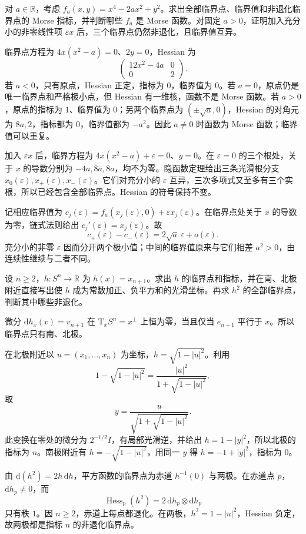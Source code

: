 \BookExercises
\begin{exercise}\label{g2:ex:quartic-morse-bifurcation}
	对 \(a\in\mathbb R\)，考虑 \(f_a(x,y)=x^4-2ax^2+y^2\)。求出全部临界点、临界值和非退化临界点的 Morse 指标，并判断哪些 \(f_a\) 是 Morse 函数。对固定 \(a>0\)，证明加入充分小的非零线性项 \(\varepsilon x\) 后，三个临界点仍然非退化，且临界值互异。
\end{exercise}
\begin{solution}
	临界点方程为 \(4x(x^2-a)=0\)、\(2y=0\)，Hessian 为
	\[
		\begin{pmatrix}12x^2-4a&0\\0&2\end{pmatrix}.
	\]
	若 \(a<0\)，只有原点，Hessian 正定，指标为 \(0\)，临界值为 \(0\)。若 \(a=0\)，原点仍是唯一临界点和严格极小点，但 Hessian 有一维核，函数不是 Morse 函数。若 \(a>0\)，原点的指标为 \(1\)、临界值为 \(0\)；另两个临界点为 \((\pm\sqrt a,0)\)，Hessian 的对角元为 \(8a,2\)，指标都为 \(0\)，临界值都为 \(-a^2\)。因此 \(a\ne0\) 时函数为 Morse 函数；临界值可以重复。

	加入 \(\varepsilon x\) 后，临界方程为 \(4x(x^2-a)+\varepsilon=0\)、\(y=0\)。在 \(\varepsilon=0\) 的三个根处，关于 \(x\) 的导数分别为 \(-4a,8a,8a\)，均不为零。隐函数定理给出三条光滑根分支 \(x_0(\varepsilon),x_+(\varepsilon),x_-(\varepsilon)\)。它们对充分小的 \(\varepsilon\) 互异，三次多项式又至多有三个实根，所以已经包含全部临界点。Hessian 的符号保持不变。

	记相应临界值为 \(c_j(\varepsilon)=f_a(x_j(\varepsilon),0)+\varepsilon x_j(\varepsilon)\)。在临界点处关于 \(x\) 的导数为零，链式法则给出 \(c_j'(\varepsilon)=x_j(\varepsilon)\)。故
	\[
		c_+(\varepsilon)-c_-(\varepsilon)=2\sqrt a\,\varepsilon+o(\varepsilon).
	\]
	充分小的非零 \(\varepsilon\) 因而分开两个极小值；中间的临界值原来与它们相差 \(a^2>0\)，由连续性继续与二者不同。
\end{solution}

\begin{exercise}\label{g2:ex:sphere-height-morse-coordinates}
	设 \(n\ge2\)，\(h:S^n\to\mathbb R\) 为 \(h(x)=x_{n+1}\)。求出 \(h\) 的临界点和指标，并在南、北极附近直接写出使 \(h\) 成为常数加正、负平方和的光滑坐标。再求 \(h^2\) 的全部临界点，判断其中哪些非退化。
\end{exercise}
\begin{solution}
	微分 \(\mathrm dh_x(v)=v_{n+1}\) 在 \(\mathrm T_xS^n=x^\perp\) 上恒为零，当且仅当 \(e_{n+1}\) 平行于 \(x\)。所以临界点只有南、北极。

	在北极附近以 \(u=(x_1,\ldots,x_n)\) 为坐标，\(h=\sqrt{1-|u|^2}\)。利用
	\[
		1-\sqrt{1-|u|^2}=\frac{|u|^2}{1+\sqrt{1-|u|^2}},
	\]
	取
	\[
		y=\frac{u}{\sqrt{1+\sqrt{1-|u|^2}}}.
	\]
	此变换在零处的微分为 \(2^{-1/2}I\)，有局部光滑逆，并给出 \(h=1-|y|^2\)，所以北极的指标为 \(n\)。南极附近有 \(h=-\sqrt{1-|u|^2}\)，用同一 \(y\) 得 \(h=-1+|y|^2\)，指标为 \(0\)。

	由 \(\mathrm d(h^2)=2h\,\mathrm dh\)，平方函数的临界点为赤道 \(h^{-1}(0)\) 与两极。在赤道点 \(p\)，\(\mathrm dh_p\ne0\)，而
	\[
		\operatorname{Hess}_p(h^2)=2\,\mathrm dh_p\otimes\mathrm dh_p
	\]
	只有秩 \(1\)。因 \(n\ge2\)，赤道上每点都退化。在两极，\(h^2=1-|u|^2\)，Hessian 负定，故两极都是指标 \(n\) 的非退化临界点。
\end{solution}

